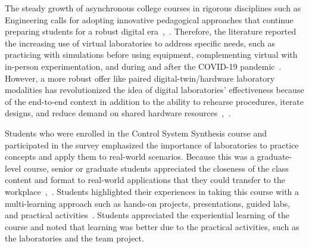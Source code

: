 \documentclass[journal]{IEEEtran}
\begin{document}
The steady growth of asynchronous college courses in rigorous disciplines such as Engineering calls for adopting innovative pedagogical approaches that continue preparing students for a robust digital era~\cite{chaconvasquez2024digitalControlEducation},~\cite{quanser2021yorkhybridlab,quanser2022calgaryhybridlearning,mohammadi2025stralsundhybridlabs,mohammadi2025epflremotelabs}. Therefore, the literature reported the increasing use of virtual laboratories to address specific needs, such as practicing with simulations before using equipment, complementing virtual with in-person experimentation, and during and after the COVID-19 pandemic~\cite{quanser2021yorkhybridlab,quanser2022calgaryhybridlearning,mohammadi2025stralsundhybridlabs,mohammadi2025epflremotelabs}. However, a more robust offer like paired digital-twin/hardware laboratory modalities has revolutionized the idea of digital laboratories’ effectiveness because of the end-to-end context in addition to the ability to rehearse procedures, iterate designs, and reduce demand on shared hardware resources~\cite{ghazi2024djiTelloEducationalControl},~\cite{qinghua2014}.

Students who were enrolled in the Control System Synthesis course and participated in the survey emphasized the importance of laboratories to practice concepts and apply them to real-world scenarios. Because this was a graduate-level course, senior or graduate students appreciated the closeness of the class content and format to real-world applications that they could transfer to the workplace~\cite{chaconvasquez2024digitalControlEducation},~\cite{buiu2008}. Students highlighted their experiences in taking this course with a multi-learning approach such as hands-on projects, presentations, guided labs, and practical activities~\cite{serbezov2022openAccessResourcesFeedbackDynamicsControl}. Students appreciated the experiential learning of the course and noted that learning was better due to the practical activities, such as the laboratories and the team project. 


\end{document}
